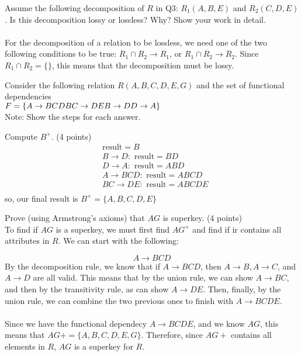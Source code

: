 \documentclass[a4 paper]{article}
\begin{document}

Assume the following decomposition of $R$ in Q3: $R_{1}(A, B, E)$ and $R_{2}(C, D, E)$. Is this decomposition lossy or lossless? Why? Show your work in detail.\\\\
For the decomposition of a relation to be lossless, we need one of the two following conditions to be true: $R_1 \cap R_2\rightarrow R_1$, or $R_1 \cap R_2\rightarrow R_2$.
Since $R_1\cap R_2=\{\}$, this means that the decomposition must be lossy.



Consider the following relation $R(A, B, C, D, E, G)$ and the set of functional dependencies \\$F = \{
\\A \rightarrow BCD\\
BC \rightarrow DE\\
B \rightarrow D\\
D \rightarrow A\}$\\

\noindent Note: Show the steps for each answer.

 Compute $B^{+}$. \indent (4 points)\\
\begin{align*}
  &\text{result} = B\\
  &B\rightarrow D: \text{ result} = BD\\
  &D\rightarrow A: \text{ result} = ABD\\
  &A\rightarrow BCD: \text{ result} = ABCD\\
  &BC\rightarrow DE: \text{ result} = ABCDE\\
\end{align*}
so, our final result is $B^+=\{A,B,C,D,E\}$




 Prove (using Armstrong's axioms) that $AG$ is superkey. \indent (4 points)\\
To find if $AG$ is a superkey, we must first find $AG^+$ and find if ir contains all attributes in $R$. We can start with the following:

$$A\rightarrow BCD$$
By the decomposition rule, we know that if $A\rightarrow BCD$, then $A\rightarrow B, A\rightarrow C$, and $A\rightarrow D$ are all valid. This means that by the union rule, we can show $A\rightarrow BC$, and then by the transitivity rule, as can show $A\rightarrow DE$. Then, finally, by the union rule, we can combine the two previous ones to finish with $A\rightarrow BCDE$.\\\\
Since we have the functional dependecy $A\rightarrow BCDE$, and we know $AG$, this means that $AG+=\{A, B, C, D, E, G\}$. Therefore, since $AG+$ contains all elements in $R$, $AG$ is a superkey for $R$.
\end{document}
